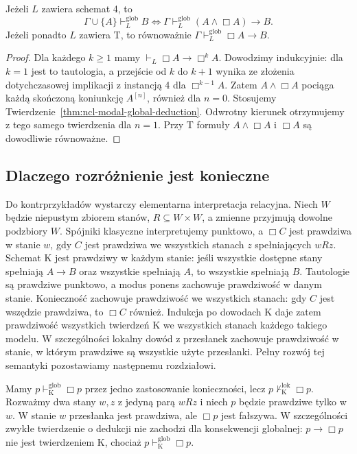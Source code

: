 \begin{wniosek}
\label{cor:ncl-modal-global-deduction-K4}
Jeżeli $L$ zawiera schemat 4, to
\[
 \Gamma\cup\{A\}\vdash_L^{\mathrm{glob}} B
 \iff
 \Gamma\vdash_L^{\mathrm{glob}}(A\wedge\Box A)\to B.
\]
Jeżeli ponadto $L$ zawiera T, to równoważnie
$\Gamma\vdash_L^{\mathrm{glob}}\Box A\to B$.
\end{wniosek}
\begin{proof}
Dla każdego $k\geq1$ mamy
$\vdash_L\Box A\to\Box^k A$.
Dowodzimy indukcyjnie: dla $k=1$ jest to
tautologia, a przejście od $k$ do $k+1$
wynika ze złożenia dotychczasowej implikacji
z instancją 4 dla $\Box^{k-1}A$.
Zatem $A\wedge\Box A$ pociąga każdą
skończoną koniunkcję $A^{[n]}$, również
dla $n=0$. Stosujemy
Twierdzenie~\ref{thm:ncl-modal-global-deduction}.
Odwrotny kierunek otrzymujemy z tego
samego twierdzenia dla $n=1$.
Przy T formuły $A\wedge\Box A$ i $\Box A$
są dowodliwie równoważne.
\end{proof}

\subsection{Dlaczego rozróżnienie jest konieczne}

Do kontrprzykładów wystarczy elementarna
interpretacja relacyjna. Niech $W$ będzie
niepustym zbiorem stanów, $R\subseteq W\times W$,
a zmienne przyjmują dowolne podzbiory $W$.
Spójniki klasyczne interpretujemy punktowo,
a $\Box C$ jest prawdziwa w stanie $w$,
gdy $C$ jest prawdziwa we wszystkich stanach
$z$ spełniających $wRz$.
Schemat K jest prawdziwy w każdym stanie:
jeśli wszystkie dostępne stany spełniają
$A\to B$ oraz wszystkie spełniają $A$,
to wszystkie spełniają $B$.
Tautologie są prawdziwe punktowo, a modus
ponens zachowuje prawdziwość w danym stanie.
Konieczność zachowuje prawdziwość we wszystkich
stanach: gdy $C$ jest wszędzie prawdziwa, to
$\Box C$ również. Indukcja po dowodach K daje
zatem prawdziwość wszystkich twierdzeń K
we wszystkich stanach każdego takiego modelu.
W szczególności lokalny dowód z przesłanek
zachowuje prawdziwość w stanie, w którym
prawdziwe są wszystkie użyte przesłanki.
Pełny rozwój tej semantyki pozostawiamy
następnemu rozdziałowi.

\begin{przyklad}
\label{ex:ncl-modal-local-global-difference}
Mamy $p\vdash_{\mathrm K}^{\mathrm{glob}}\Box p$
przez jedno zastosowanie konieczności, lecz
$p\nvdash_{\mathrm K}^{\mathrm{lok}}\Box p$.
Rozważmy dwa stany $w,z$ z jedyną parą
$wRz$ i niech $p$ będzie prawdziwe tylko w $w$.
W stanie $w$ przesłanka jest prawdziwa,
ale $\Box p$ jest fałszywa.
W szczególności zwykłe twierdzenie o dedukcji
nie zachodzi dla konsekwencji globalnej:
$p\to\Box p$ nie jest twierdzeniem K,
chociaż $p\vdash_{\mathrm K}^{\mathrm{glob}}\Box p$.
\end{przyklad}

